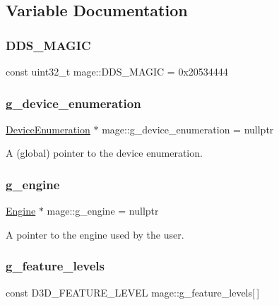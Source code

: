 \subsection{Variable Documentation}
\hypertarget{namespacemage_a52f784e41b51fee843891c6b5e9be479}{}\label{namespacemage_a52f784e41b51fee843891c6b5e9be479} 
\subsubsection{\texorpdfstring{D\+D\+S\+\_\+\+M\+A\+G\+IC}{DDS\_MAGIC}}
{\footnotesize\ttfamily const uint32\+\_\+t mage\+::\+D\+D\+S\+\_\+\+M\+A\+G\+IC = 0x20534444}

\hypertarget{namespacemage_a73e54b9b368875ed0281ced59e2fca7e}{}\label{namespacemage_a73e54b9b368875ed0281ced59e2fca7e} 
\subsubsection{\texorpdfstring{g\+\_\+device\+\_\+enumeration}{g\_device\_enumeration}}
{\footnotesize\ttfamily \hyperlink{classmage_1_1_device_enumeration}{Device\+Enumeration} $\ast$ mage\+::g\+\_\+device\+\_\+enumeration = nullptr}

A (global) pointer to the device enumeration. \hypertarget{namespacemage_a84bf83f1e8779d884452cdf08f56c19a}{}\label{namespacemage_a84bf83f1e8779d884452cdf08f56c19a} 
\subsubsection{\texorpdfstring{g\+\_\+engine}{g\_engine}}
{\footnotesize\ttfamily \hyperlink{classmage_1_1_engine}{Engine} $\ast$ mage\+::g\+\_\+engine = nullptr}

A pointer to the engine used by the user. \hypertarget{namespacemage_add3b7e051df553262371e077d9d66fd9}{}\label{namespacemage_add3b7e051df553262371e077d9d66fd9} 
\subsubsection{\texorpdfstring{g\+\_\+feature\+\_\+levels}{g\_feature\_levels}}
{\footnotesize\ttfamily const D3\+D\+\_\+\+F\+E\+A\+T\+U\+R\+E\+\_\+\+L\+E\+V\+EL mage\+::g\+\_\+feature\+\_\+levels\mbox{[}$\,$\mbox{]}}

